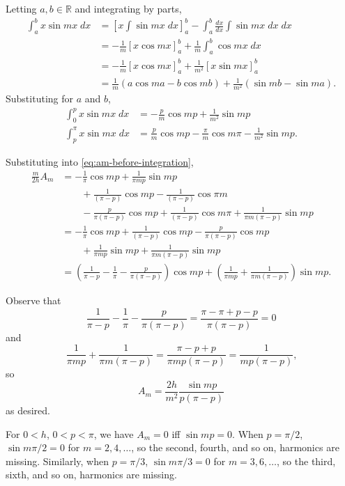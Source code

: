 \documentclass[oneside]{article}
\newcommand\bbR{\mathbb{R}}
\begin{document}
\begin{enumerate}[label=\textbf{\arabic*.}]
  Letting $a, b \in \bbR$ and integrating by parts, \begin{align*}
    \int_a^b x\sin mx\; dx
    &= \left[x\int\sin mx\;dx\right]_a^b
      - \int_a^b \frac{dx}{dx} \int \sin mx\;dx\;dx \\
    &= -\frac{1}{m}\left[x\cos mx\right]_a^b
      + \frac{1}{m} \int_a^b \cos mx\;dx \\
    &= -\frac{1}{m}\left[x\cos mx\right]_a^b
      + \frac{1}{m^2}\left[x\sin mx\right]_a^b \\
    &= \frac{1}{m}\left(a\cos ma - b\cos mb\right)
      + \frac{1}{m^2}\left(\sin mb - \sin ma\right) \text{.}
  \end{align*} Substituting for $a$ and $b$, \begin{align*}
    \int_0^p x\sin mx\; dx
    &= -\frac{p}{m} \cos mp + \frac{1}{m^2} \sin mp \\
    \int_p^\pi x\sin mx\; dx
    &= \frac{p}{m}\cos mp - \frac{\pi}{m}\cos m\pi - \frac{1}{m^2}\sin mp
    \text{.}
  \end{align*}

  Substituting into \eqref{eq:am-before-integration},\begin{align*}
    \frac{m}{2h}A_m &= -\frac{1}{\pi}\cos mp + \frac{1}{\pi mp} \sin mp \\
    &\qquad+\frac{1}{(\pi - p)}\cos mp - \frac{1}{(\pi - p)}\cos \pi m \\
    &\qquad-\frac{p}{\pi(\pi - p)}\cos mp
      + \frac{1}{(\pi - p)}\cos m\pi
      + \frac{1}{\pi m(\pi - p)}\sin mp \\
    &= -\frac{1}{\pi}\cos mp +\frac{1}{(\pi - p)}\cos mp
      -\frac{p}{\pi(\pi - p)}\cos mp \\
    &\qquad
      + \frac{1}{\pi mp} \sin mp + \frac{1}{\pi m(\pi - p)}\sin mp \\
    &= \left(\frac{1}{\pi-p} - \frac{1}{\pi} - \frac{p}{\pi(\pi-p)}\right)
        \cos mp
       + \left( \frac{1}{\pi mp} + \frac{1}{\pi m(\pi-p)} \right) \sin mp
       \text{.}
  \end{align*}

  Observe that \[
    \frac{1}{\pi-p} - \frac{1}{\pi} - \frac{p}{\pi(\pi-p)}
    = \frac{\pi-\pi+p-p}{\pi(\pi-p)} = 0
  \] and
  \[
    \frac{1}{\pi mp} + \frac{1}{\pi m(\pi-p)}
    = \frac{\pi - p + p}{\pi mp(\pi-p)}
    =\frac{1}{mp(\pi-p)} \text{,}
  \] so \[
    A_m = \frac{2h}{m^2}\frac{\sin mp}{p(\pi-p)}
  \] as desired.

  For $0 < h$, $0 < p < \pi$, we have $A_m = 0$ iff $\sin mp = 0$. When
  $p = \pi/2$, $\sin m\pi/2 = 0$ for $m = 2,4,\dots$, so the second, fourth, and
  so on, harmonics are missing. Similarly, when $p = \pi/3$, $\sin m\pi/3 = 0$
  for $m = 3,6,\dots$, so the third, sixth, and so on, harmonics are missing.


\end{enumerate}
\end{document}
